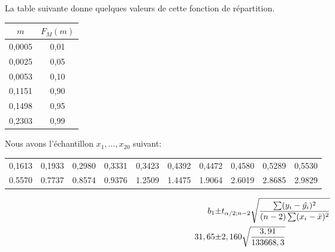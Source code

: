 \begin{questions}
La table suivante donne quelques valeurs de cette fonction de répartition.
\begin{table}[ht]
    \centering
\begin{tabular}{|cc|}
  \hline
 $m$ & $F_M(m)$ \\ 
  \hline
    0,0005 & 0,01 \\
    0,0025 & 0,05 \\
    0,0053 & 0,10 \\
    0,1151 & 0,90 \\
    0,1498 & 0,95 \\ 
    0,2303 & 0,99 \\ 
  \hline
\end{tabular}
\end{table}

Nous avons l'échantillon $x_1,\hdots,x_{20}$ suivant:

\begin{table}[ht]
\centering
\begin{tabular}{rrrrrrrrrr}
  \hline
0,1613 & 0,1933 & 0,2980 & 0,3331 & 0,3423 & 0,4392 & 0,4472 & 0,4580 & 0,5289 & 0,5530 \\ 
0.5570 & 0.7737 & 0.8574 & 0.9376 & 1.2509 & 1.4475 & 1.9064 & 2.6019 & 2.8685 & 2.9829 \\ 
   \hline
\end{tabular}
\end{table}

\begin{align*}
    b_1\pm& t_{\alpha/2;n-2}\sqrt{\frac{\sum(y_i-\hat{y_i})^2}{(n-2)\sum(x_i-\Bar{x})^2}}\\
    31,65 \pm& 2,160 \sqrt{\frac{3,91}{133668,3}}

\end{align*}
\end{questions}

